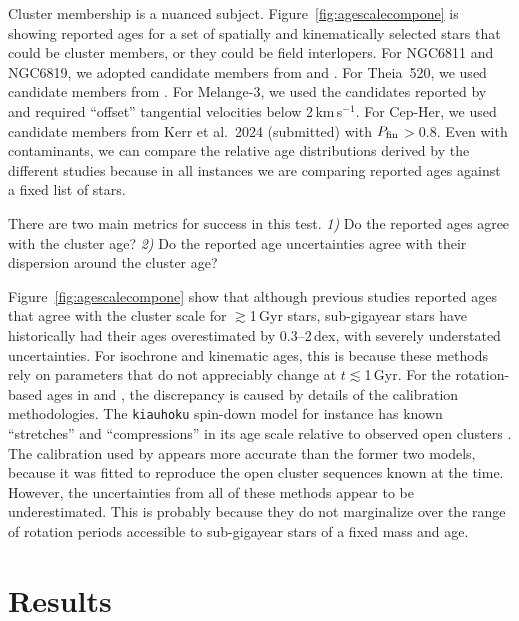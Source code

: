 \documentclass[11pt,twocolumn,tighten,linenumbers]{aastex63}
\newcommand{\kms}{{km\,s$^{-1}$}}
\begin{document}
Cluster membership is a nuanced subject.
Figure~\ref{fig:agescalecompone} is showing reported ages for a set of
spatially and kinematically selected stars that could be cluster
members, or they could be field interlopers.  For NGC6811 and NGC6819,
we adopted candidate members from
\citet{2018A&A...618A..93C,CantatGaudin_2020} and
\citet{Kounkel_2020}.  For Theia~520, we used candidate members from
\citet{Kounkel_2020}.  For Melange-3, we used the candidates reported
by \citet{Barber_2022} and required ``offset'' tangential velocities
below 2\,\kms.  For Cep-Her, we used candidate members from Kerr et
al.~2024 (submitted) with $P_{\rm fin}$$>$0.8.  Even with
contaminants, we can compare the relative age distributions derived by
the different studies because in all instances we are comparing
reported ages against a fixed list of stars.

There are two main metrics for success in this test. {\it 1)} Do the
reported ages agree with the cluster age? {\it 2)} Do the reported age
uncertainties agree with their dispersion around the cluster age?

Figure~\ref{fig:agescalecompone} show that although previous studies
reported ages that agree with the cluster scale for $\gtrsim$1\,Gyr
stars, sub-gigayear stars have historically had their ages
overestimated by 0.3--2\,dex, with severely understated uncertainties.
For isochrone and kinematic ages, this is because these methods rely
on parameters that do not appreciably change at $t$$\lesssim$1\,Gyr.
For the rotation-based ages in \citet{2023ApJ...952..131M} and
\citet{2024AJ....167..159L}, the discrepancy is caused by details of
the calibration methodologies.  The \texttt{kiauhoku} spin-down model
for instance has known ``stretches'' and ``compressions'' in its age
scale relative to observed open clusters \citep[see][Sec.
7.3]{2023ApJ...952..131M}.  The \citet{Mamajek_2008} calibration used
by \citet{Reinhold_2015} appears more accurate than the former two
models, because it was fitted to reproduce the open cluster sequences
known at the time.  However, the uncertainties from all of these
methods appear to be underestimated.  This is probably because they do
not marginalize over the range of rotation periods accessible to
sub-gigayear stars of a fixed mass and age.



\section{Results}
\label{sec:results}
\end{document}
